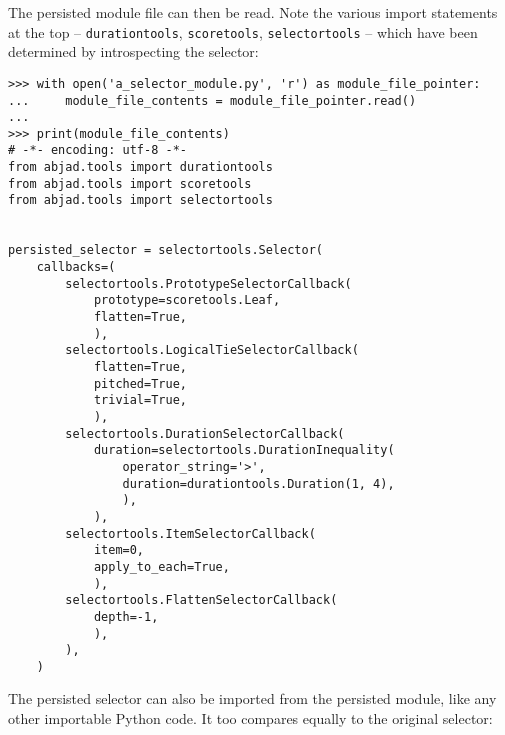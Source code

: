 \noindent The persisted module file can then be read. Note the various import
statements at the top -- \texttt{durationtools}, \texttt{scoretools},
\texttt{selectortools} -- which have been determined by introspecting the
selector:

\begin{comment}
<abjad>
with open('a_selector_module.py', 'r') as module_file_pointer:
    module_file_contents = module_file_pointer.read()

print(module_file_contents)
</abjad>
\end{comment}

\begin{abjadbookoutput}
\begin{singlespacing}
\vspace{-0.5\baselineskip}
\begin{verbatim}
>>> with open('a_selector_module.py', 'r') as module_file_pointer:
...     module_file_contents = module_file_pointer.read()
...
>>> print(module_file_contents)
# -*- encoding: utf-8 -*-
from abjad.tools import durationtools
from abjad.tools import scoretools
from abjad.tools import selectortools


persisted_selector = selectortools.Selector(
    callbacks=(
        selectortools.PrototypeSelectorCallback(
            prototype=scoretools.Leaf,
            flatten=True,
            ),
        selectortools.LogicalTieSelectorCallback(
            flatten=True,
            pitched=True,
            trivial=True,
            ),
        selectortools.DurationSelectorCallback(
            duration=selectortools.DurationInequality(
                operator_string='>',
                duration=durationtools.Duration(1, 4),
                ),
            ),
        selectortools.ItemSelectorCallback(
            item=0,
            apply_to_each=True,
            ),
        selectortools.FlattenSelectorCallback(
            depth=-1,
            ),
        ),
    )
\end{verbatim}
\end{singlespacing}
\end{abjadbookoutput}

\noindent The persisted selector can also be imported from the persisted
module, like any other importable Python code. It too compares equally to the
original selector:

\begin{comment}
<abjad>
from a_selector_module import persisted_selector
persisted_selector == selector
</abjad>
\end{comment}

